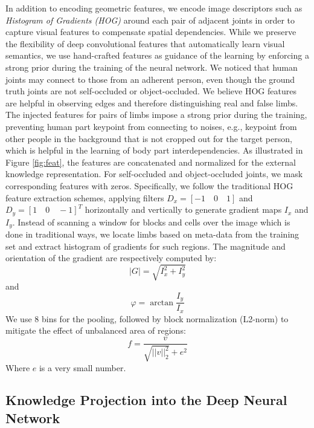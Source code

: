 \documentclass[journal ]{IEEEtran}
\begin{document}
In addition to encoding geometric features, we encode image descriptors such as \textit{Histogram of Gradients (HOG)} \cite{dalal2005histograms} around each pair of adjacent joints in order to capture visual features to compensate spatial dependencies. 
While we preserve the flexibility of deep convolutional features that automatically learn visual semantics, we use hand-crafted features as guidance of the learning by enforcing a strong prior during the training of the neural network. We noticed that human joints may connect to those from an adherent person, even though the ground truth joints are not self-occluded or object-occluded. We believe HOG features are helpful in observing edges and therefore distinguishing real and false limbs.
The injected features for pairs of limbs impose a strong prior during the training, preventing human part keypoint from connecting to noises, e.g., keypoint from other people in the background that is not cropped out for the target person, which is helpful in the learning of body part interdependencies. 
As illustrated in Figure \ref{fig:feat}, the features are concatenated and normalized for the external knowledge representation. For self-occluded and object-occluded joints, we mask corresponding features with zeros.
Specifically, we follow the traditional HOG feature extraction schemes, applying filters $D_{x} = [-1 \quad 0 \quad 1]$ and $D_{y} = [1 \quad 0 \quad -1]^{T}$ horizontally and vertically to generate gradient maps $I_{x}$ and $I_{y}$. Instead of scanning a window for blocks and cells over the image which is done in traditional ways, we locate limbs based on meta-data from the training set and extract histogram of gradients for such regions. 
The magnitude and orientation of the gradient are respectively computed by:
\begin{equation}
|G| = \sqrt{I_{x}^{2} + I_{y}^{2}} 
\end{equation}
and
\begin{equation}
\varphi = \arctan\dfrac{I_{y}}{I_{x}}
\end{equation}
We use $8$ bins for the pooling, followed by block normalization (L2-norm) to mitigate the effect of unbalanced area of regions:
\begin{equation}
f = \dfrac{v}{\sqrt{||v||_{2}^{2}} + e^{2}}
\end{equation}
Where $e$ is a very small number.

\subsection{Knowledge Projection into the Deep Neural Network}   
\end{document}
